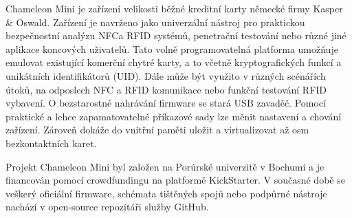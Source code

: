 Chameleon Mini je zařízení velikosti běžné kreditní karty německé firmy Kasper \& Oswald. Zařízení je navrženo jako univerzální nástroj pro praktickou bezpečnostní analýzu NFC\footnotemark a RFID systémů, penetrační testování nebo různé jiné aplikace koncových uživatelů. Tato volně programovatelná platforma umožňuje emulovat existující komerční chytré karty, a to včetně kryptografických funkcí a unikátních identifikátorů (UID). Dále může být využito v různých scénářích útoků, na odposlech NFC a RFID komunikace nebo funkční testování RFID vybavení. O bezstarostné nahrávání firmware se stará USB zavaděč. Pomocí praktické a lehce zapamatovatelné příkazové sady lze měnit nastavení a chování zařízení. Zároveň dokáže do vnitřní paměti uložit a virtualizovat až osm bezkontaktních karet.\cite{ChameleonKickStarter} 
\par 
Projekt Chameleon Mini byl založen na Porúrské univerzitě v Bochumi a je financován pomocí crowdfundingu na platformě KickStarter. V současné době se veškerý oficiální firmware, schémata tištěných spojů nebo podpůrné nástroje nachází v {open-source} repozitáři služby GitHub\footnotemark.\cite{ChameleonDocs}

